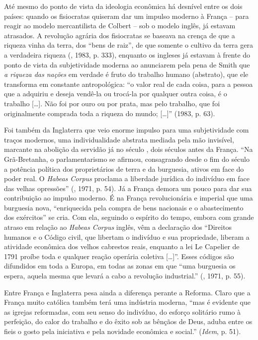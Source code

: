 Até mesmo do ponto de vista da ideologia econômica há desnível entre os
dois países: quando os fisiocratas quiseram dar um impulso moderno à
França -- para reagir ao modelo mercantilista de Colbert -- sob o modelo
inglês, já estavam atrasados. A revolução agrária dos fisiocratas se
baseava na crença de que a riqueza vinha da terra, dos ``bens de raiz'',
de que somente o cultivo da terra gera a verdadeira riqueza (,
1983, p. 333), enquanto os ingleses já estavam à frente do ponto de
vista da subjetividade moderna ao anunciarem pela pena de Smith que
\emph{a riqueza das nações} em verdade é fruto do trabalho humano
(abstrato), que ele transforma em constante antropológica: ``o valor
real de cada coisa, para a pessoa que a adquiriu e deseja vendê-la ou
trocá-la por qualquer outra coisa, é o trabalho [\ldots{}]. Não foi
por ouro ou por prata, mas pelo trabalho, que foi originalmente comprada
toda a riqueza do mundo; [\ldots{}]'' (1983, p. 63).

Foi também da Inglaterra que veio enorme impulso para uma subjetividade
com traços modernos, uma individualidade abstrata mediada pela mão
invisível, marcante na abolição da servidão já no século , dois
séculos antes da França. ``Na Grã-Bretanha, o parlamentarismo se
afirmou, consagrando desde o fim do século  a potência política dos
proprietários de terra e da burguesia, ativos em face do poder real. O
\emph{Habeas Corpus} proclama a liberdade jurídica do indivíduo em face
das velhas opressões'' (, 1971, p. 54). Já a França demora um pouco
para dar sua contribuição ao impulso moderno. É na França revolucionária
e imperial que uma burguesia nova, ``enriquecida pela compra de bens
nacionais e o abastecimento dos exércitos'' se cria. Com ela, seguindo o
espírito do tempo, embora com grande atraso em relação ao \emph{Habeas
Corpus} inglês, vêm a declaração dos ``Direitos humanos e o Código
civil, que libertam o indivíduo e sua propriedade, liberam a atividade
econômica dos velhos cabrestos reais, enquanto a lei Le Capelier de 1791
proíbe toda e qualquer reação operária coletiva [\ldots{}]''. Esses
códigos são difundidos em toda a Europa, em todas as zonas em que ``uma
burguesia os espera, aquela mesma que levará a cabo a revolução
industrial.'' (, 1971, p. 55).

Entre França e Inglaterra pesa ainda a diferença perante a Reforma.
Claro que a França muito católica também terá uma indústria moderna,
``mas é evidente que as igrejas reformadas, com seu senso do indivíduo,
do esforço solitário rumo à perfeição, do calor do trabalho e do êxito
sob as bênçãos de Deus, aduba entre os fieis o gosto pela iniciativa e
pela novidade econômica e social.'' (\emph{Idem}, p. 51).

